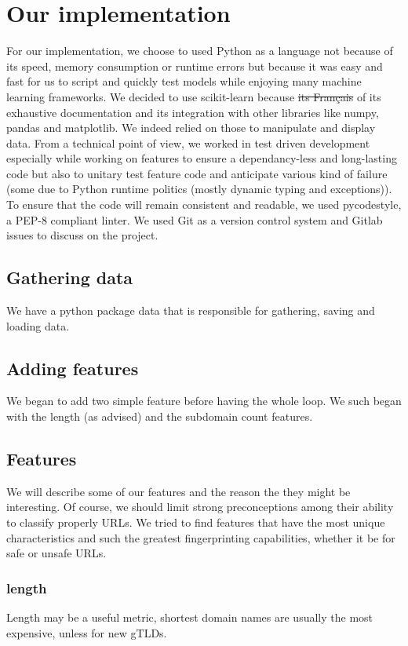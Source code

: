 \documentclass[conference,11pt]{IEEEtran}
\begin{document}
\section{Our implementation}
For our implementation, we choose to used Python as a language not because of
its speed, memory consumption or runtime errors but because it was easy and fast
for us to script and quickly test models while enjoying many machine learning
frameworks. We decided to use scikit-learn because \sout{its Français} of its
exhaustive documentation and its integration with other libraries like numpy,
pandas and matplotlib. We indeed relied on those to manipulate and display data.
From a technical point of view, we worked in test driven development especially
while working on features to ensure a dependancy-less and long-lasting code but
also to unitary test feature code and anticipate various kind of failure (some
due to Python runtime politics (mostly dynamic typing and exceptions)). To
ensure that the code will remain consistent and readable, we used pycodestyle, a
PEP-8 compliant linter. We used Git as a version control system and Gitlab
issues to discuss on the project.

\subsection{Gathering data}
We have a python package data that is responsible for gathering, saving and
loading data.

\subsection{Adding features}
We began to add two simple feature before having the whole loop. We such began
with the length (as advised) and the subdomain count features.

\subsection{Features}
We will describe some of our features and the reason the they might be
interesting. Of course, we should limit strong preconceptions among their
ability to classify properly URLs. We tried to find features that have the most
unique characteristics and such the greatest fingerprinting capabilities,
whether it be for safe or unsafe URLs.

\subsubsection{length}
Length may be a useful metric, shortest domain names are usually the most
expensive, unless for new gTLDs.
\end{document}
